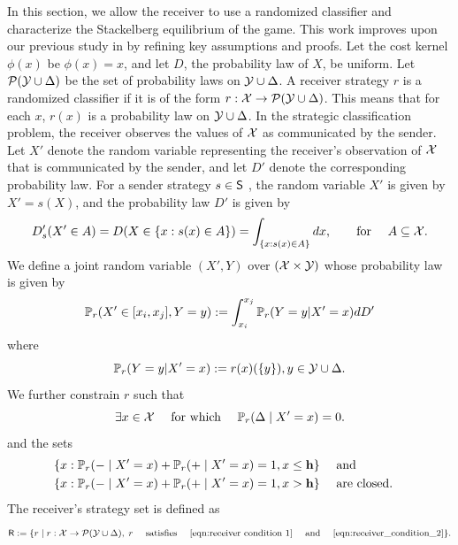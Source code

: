 In this section, we allow the receiver to use a randomized classifier and characterize the Stackelberg equilibrium of the game. This work improves upon our previous study in \cite{singh2024optimal} by refining key assumptions and proofs. Let the cost kernel  $\phi(x)$ be $\phi(x) = x$, and let $D$, the probability law of $X$, be uniform. Let $\mathcal{P}(\mathcal{Y} \cup \Delta)$ be the set of probability laws on $\mathcal{Y} \cup \Delta$. A receiver strategy $r$ is a randomized classifier if it is of the form $r: \mathcal{X} \to \mathcal{P}(\mathcal{Y} \cup \Delta)$. This means that for each $x$, $r(x)$ is a probability law on $\mathcal{Y} \cup \Delta$. In the strategic classification problem, the receiver observes the values of $\mathcal{X}$ as communicated by the sender. Let $X'$ denote the random variable representing the receiver's observation of $\mathcal{X}$ that is communicated by the sender, and let $D'$ denote the corresponding probability law. For a sender strategy $s \in \mathsf{S}$ , the random variable $X'$ is given by $X' = s(X)$, and the probability law $D'$ is given by
\[
D'_s(X' \in A) = D(X \in \{x : s(x) \in A\}) = \int_{\{x : s(x) \in A\}} dx, \quad \hbox{\quad for \quad} A \subseteq \mathcal{X}.
\]
We define a joint random variable $(X',Y)$ over $(\mathcal{X} \times \mathcal{Y})$ whose probability law is given by
\[\mathbb{P}_r(X' \in [x_i,x_j],Y=y) := \int_{x_i}^{x_j}\mathbb{P}_r(Y=y|X'=x)dD'
\]
where
\begin{equation}\label{eqn:conditional}
  \mathbb{P}_{r}(Y=y|X'=x) := r(x)(\{y\}), y \in \mathcal{Y}\cup \Delta.
\end{equation}
We further constrain $r$ such that
\begin{equation}\label{eqn:receiver condition 1}
    \exists x \in \cg{X} \text{ for which } \prob_r(\Delta \mid X' = x) = 0.
\end{equation}
and the sets
\begin{equation}\label{eqn:receiver_condition_2}
\begin{aligned}
    &\{x : \prob_r(- \mid X' = x) + \prob_r(+ \mid X' = x) = 1, x \leq \h\} \text{ and } \\
    &\{x : \prob_r(- \mid X' = x) + \prob_r(+ \mid X' = x) = 1, x > \h\} \text{ are closed.}
\end{aligned}
\end{equation}
The receiver's strategy set is defined as
\begin{equation}\label{defn:stochastic_receiver}
	\msf{R} := \{r \mid r: \cg{X} \to \cg{P}(\cg{Y} \cup \Delta), \; r \text{ satisfies } \eqref{eqn:receiver condition 1} \text{ and } \eqref{eqn:receiver_condition_2}\}.
\end{equation}
